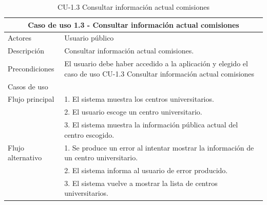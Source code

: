 \begin{table}[H]
\caption{CU-1.3 Consultar información actual comisiones}  \label{tab:CU-1.3}
        \begin{center}
            \begin{tabular}{|l|p{12cm}|}
                \hline
                \multicolumn{2}{|c|}{Caso de uso 1.3 - Consultar información actual comisiones} \\ \hline \hline
                Actores           &   Usuario público          \\  \hline
                Descripción         &   Consultar información actual comisiones. \\  \hline
                Precondiciones          &   El usuario debe haber accedido a la aplicación y elegido el caso de uso CU-1.3 Consultar información actual comisiones  \\  \hline
                Casos de uso            &          \\  \hline
                Flujo principal         &   1. El sistema muestra los centros universitarios.   \\
                &   2. El usuario escoge un centro universitario.    \\                  & 3. El sistema muestra la información pública actual del centro escogido. \\ \hline
                 Flujo alternativo    &   1. Se produce un error al intentar mostrar la información de un  centro  universitario. 
                \\  & 2. El sistema informa al usuario de error producido. 
                \\  & 3. El sistema vuelve a mostrar la lista de centros  universitarios. 
                \\
                \hline
            \end{tabular}
        \end{center}
    \end{table}

